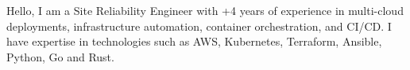\documentclass[10pt]{developercv} %
\begin{document}
\vspace{0.5cm}



\hspace{6pt}\begin{minipage}[t]{0.98\textwidth} %
	\vspace{-\baselineskip} %

	{Hello, I am a Site Reliability Engineer with +4 years of experience in multi-cloud deployments, infrastructure automation, container orchestration, and CI/CD. I have expertise in technologies such as AWS, Kubernetes, Terraform, Ansible, Python, Go and Rust.} %

\end{minipage}
\hfill %


\end{document}
